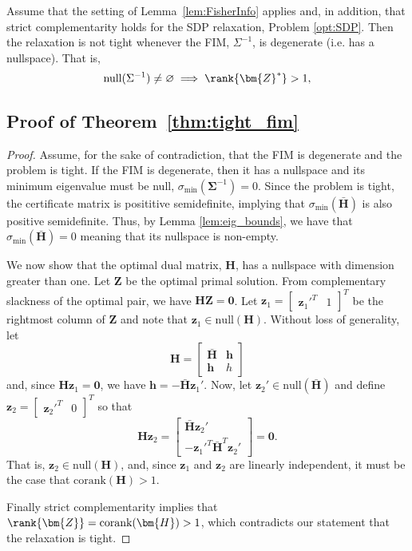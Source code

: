 \begin{theorem}\label{thm:tight_fim}
    Assume that the setting of Lemma~\ref{lem:FisherInfo} applies and, in addition, that strict complementarity holds for the SDP relaxation, Problem \eqref{opt:SDP}. Then the relaxation is not tight whenever the FIM, $\Sigma^{-1}$, is degenerate (i.e. has a nullspace). That is,
    \begin{equation}
        \mbox{null}(\Sigma^{-1}) \neq \varnothing \implies \rank{\bm{Z}^*}>1,
    \end{equation}
\end{theorem}

\subsection{Proof of Theorem~\ref{thm:tight_fim}}
\begin{proof}
Assume, for the sake of contradiction, that the FIM is degenerate and the problem is tight. If the FIM is degenerate, then it has a nullspace and its minimum eigenvalue must be null, $\sigma_{\min}(\bm{\Sigma}^{-1}) = 0$.  Since the problem is tight, the certificate matrix is posititive semidefinite, implying that $\sigma_{\min}(\bar{\bm{H}})$ is also positive semidefinite. Thus, by Lemma \ref{lem:eig_bounds}, we have that $\sigma_{\min}(\bar{\bm{H}}) = 0$ meaning that its nullspace is non-empty. 

We now show that the optimal dual matrix, $\bm{H}$, has a nullspace with dimension greater than one. Let $\bm{Z}$ be the optimal primal solution. From complementary slackness of the optimal pair, we have $\bm{H}\bm{Z} = \bm{0}$. Let $\bm{z}_1 = \begin{bmatrix} \bm{z}_1'^T & 1\end{bmatrix}^T$ be the rightmost column of $\bm{Z}$ and note that $\bm{z}_1 \in \mbox{null}(\bm{H})$. Without loss of generality, let
\begin{equation*}
	\bm{H}=\begin{bmatrix}
		\bar{\bm{H}} & \bm{h} \\ \bm{h} & h
	\end{bmatrix}
\end{equation*}
and, since $\bm{H}\bm{z}_1=\bm{0}$, we have $\bm{h} = -\bar{\bm{H}}\bm{z}_1'$.
Now, let $\bm{z}_2' \in\mbox{null}(\bar{\bm{H}}) $ and define $\bm{z}_2 = \begin{bmatrix} \bm{z}_2'^T & 0\end{bmatrix}^T$ so that
\begin{equation*}
\bm{H}\bm{z}_2 = \begin{bmatrix} \bar{\bm{H}}\bm{z}_2'\\ -\bm{z}_1'^T\bar{\bm{H}}^T\bm{z}_2' \end{bmatrix} = \bm{0}.
\end{equation*}
That is, $\bm{z}_2 \in \mbox{null}(\bm{H})$, and, since $\bm{z}_1$ and $\bm{z}_2$ are linearly independent, it must be the case that $\mbox{corank}(\bm{H})>1$.

Finally strict complementarity implies that $\rank{\bm{Z}} = \mbox{corank}(\bm{H})>1$, which contradicts our statement that the relaxation is tight.
\end{proof}
